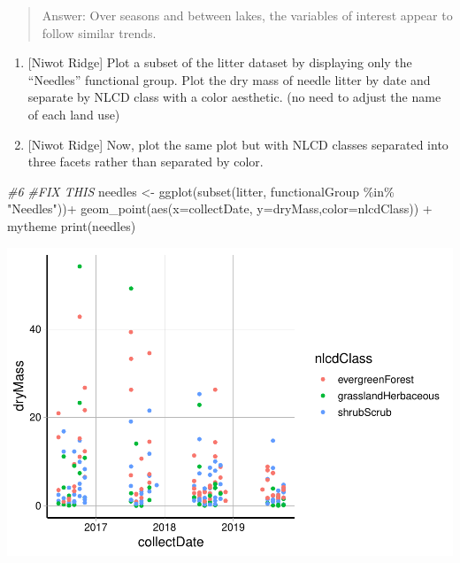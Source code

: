 \documentclass[
]{article}
\newenvironment{Shaded}{\begin{snugshade}}{\end{snugshade}}
\newcommand{\AttributeTok}[1]{\textcolor[rgb]{0.77,0.63,0.00}{#1}}
\newcommand{\CommentTok}[1]{\textcolor[rgb]{0.56,0.35,0.01}{\textit{#1}}}
\newcommand{\FunctionTok}[1]{\textcolor[rgb]{0.00,0.00,0.00}{#1}}
\newcommand{\NormalTok}[1]{#1}
\newcommand{\OtherTok}[1]{\textcolor[rgb]{0.56,0.35,0.01}{#1}}
\newcommand{\SpecialCharTok}[1]{\textcolor[rgb]{0.00,0.00,0.00}{#1}}
\newcommand{\StringTok}[1]{\textcolor[rgb]{0.31,0.60,0.02}{#1}}
\begin{document}
\begin{quote}
Answer: Over seasons and between lakes, the variables of interest appear
to follow similar trends.
\end{quote}

\begin{enumerate}
\def\labelenumi{\arabic{enumi}.}
\setcounter{enumi}{5}
\item
  {[}Niwot Ridge{]} Plot a subset of the litter dataset by displaying
  only the ``Needles'' functional group. Plot the dry mass of needle
  litter by date and separate by NLCD class with a color aesthetic. (no
  need to adjust the name of each land use)
\item
  {[}Niwot Ridge{]} Now, plot the same plot but with NLCD classes
  separated into three facets rather than separated by color.
\end{enumerate}

\begin{Shaded}
\begin{Highlighting}[]
\CommentTok{\#6}
\CommentTok{\#FIX THIS }
\NormalTok{needles }\OtherTok{\textless{}{-}} \FunctionTok{ggplot}\NormalTok{(}\FunctionTok{subset}\NormalTok{(litter, functionalGroup }\SpecialCharTok{\%in\%} \StringTok{"Needles"}\NormalTok{))}\SpecialCharTok{+}
  \FunctionTok{geom\_point}\NormalTok{(}\FunctionTok{aes}\NormalTok{(}\AttributeTok{x=}\NormalTok{collectDate, }\AttributeTok{y=}\NormalTok{dryMass,}\AttributeTok{color=}\NormalTok{nlcdClass)) }\SpecialCharTok{+}
\NormalTok{  mytheme}
\FunctionTok{print}\NormalTok{(needles)}
\end{Highlighting}
\end{Shaded}

\includegraphics{A05_DataVisualization_files/figure-latex/unnamed-chunk-5-1.pdf}
\end{document}
